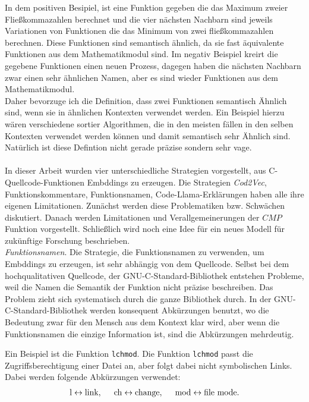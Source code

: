 \documentclass[12pt,letterpaper,ngerman]{article}
\begin{document}
In dem positiven Besipiel, ist eine Funktion gegeben
die das Maximum zweier Fließkommazahlen berechnet und die vier
nächsten Nachbarn sind jeweils Variationen von Funktionen die das
Minimum von zwei fließkommazahlen berechnen. Diese Funktionen sind
semantisch ähnlich, da sie fast äquivalente Funktionen aus dem
Mathematikmodul sind. Im negativ Beispiel kreirt die 
gegebene Funktionen einen neuen Prozess, dagegen haben die nächsten
Nachbarn zwar einen sehr ähnlichen Namen, aber es sind wieder Funktionen
aus dem Mathematikmodul.\\
Daher bevorzuge ich die Definition, dass zwei Funktionen semantisch
Ähnlich sind, wenn sie in ähnlichen Kontexten verwendet werden. 
Ein Beispiel hierzu wären verschiedene sortier Algorithmen, die in 
den meisten fällen in den selben Kontexten verwendet werden können 
und damit semantisch sehr Ähnlich sind. Natürlich ist diese Defintion
nicht gerade präzise sondern sehr vage.\\\\
In dieser Arbeit wurden vier unterschiedliche Strategien
vorgestellt, aus C-Quellcode-Funktionen Embddings zu erzeugen.
Die Strategien \textit{Cod2Vec}, Funktionskommentare, 
Funktionsnamen, Code-Llama-Erklärungen haben alle ihre 
eigenen Limitationen. Zunächst werden diese Problematiken
bzw. Schwächen diskutiert. Danach werden Limitationen 
und Verallgemeinerungen der $CMP$ Funktion vorgestellt.
Schließlich wird noch eine Idee für ein neues Modell 
für zukünftige Forschung beschrieben.
\pagebreak\\
\textit{Funktionsnamen}. Die Strategie, die Funktionsnamen zu 
verwenden, um Embddings zu erzeugen, ist sehr abhängig von 
dem Quellcode. Selbst bei dem hochqualitativen Quellcode, 
der GNU-C-Standard-Bibliothek entstehen Probleme, weil die 
Namen die Semantik der Funktion nicht präzise beschreiben.
Das Problem zieht sich systematisch durch die ganze Bibliothek 
durch. In der GNU-C-Standard-Bibliothek werden konsequent 
Abkürzungen benutzt, wo die Bedeutung zwar für den Mensch 
aus dem Kontext klar wird, aber wenn die Funktionsnamen 
die einzige Information ist, sind die Abkürzungen mehrdeutig.
\begin{example}
  Ein Beispiel ist die Funktion
  \verb|lchmod|. Die Funktion \verb|lchmod| passt die
  Zugriffsberechtigung einer Datei an, aber folgt dabei nicht
  symbolischen Links. Dabei werden folgende Abkürzungen verwendet:
  \begin{align*}
    \text{l} \leftrightarrow \text{link}, \hspace{0.5cm}
    \text{ch} \leftrightarrow \text{change},\hspace{0.5cm}
    \text{mod} \leftrightarrow \text{file mode}.
  \end{align*}
\end{example}
\end{document}

